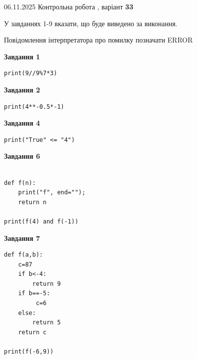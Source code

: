 \documentclass[12pt, ukrainian]{article}
\begin{document}
{\Large{06.11.2025 Контрольна робота , варіант  \No \textbf { 33 }\par}}
{
\begin {large}
У завданнях 1-9 вказати, що буде виведено за виконання.

Повідомлення інтерпретатора про помилку позначати ERROR

\begin{minipage}[t]{7.5cm}

\begin{center}
\textbf{Завдання 1}
\end{center}

\begin{verbatim}
print(9//9%7*3)
\end{verbatim}



\begin{center}
\textbf{Завдання 2}
\end{center}

\begin{verbatim}
print(4**-0.5*-1)
\end{verbatim}



\begin{center}
\textbf{Завдання 4}
\end{center}

\begin{verbatim}
print("True" <= "4")
\end{verbatim}



\begin{center}
\textbf{Завдання 6}
\end{center}

\begin{verbatim}

def f(n):
    print("f", end="");
    return n

print(f(4) and f(-1))
\end{verbatim}



\begin{center}
\textbf{Завдання 7}
\end{center}

\begin{verbatim}
def f(a,b):
    c=87
    if b<-4:
        return 9
    if b==-5:
         c=6
    else: 
        return 5
    return c

print(f(-6,9))
\end{verbatim}


\end{minipage}
\end{large}}
\end{document}
